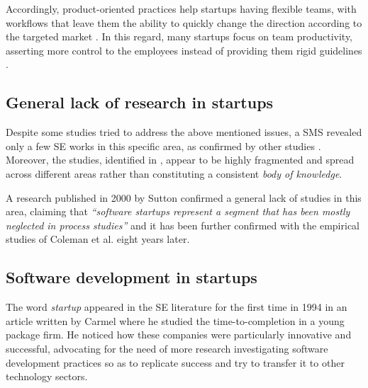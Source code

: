 \documentclass[10pt,journal,letterpaper,compsoc]{IEEEtran}
\begin{document}
Accordingly, product-oriented practices help startups having flexible teams,
with workflows that leave them the ability to quickly change the direction
according to the targeted market  \cite{Heitlager2007,Sutton2000}. In this
regard, many startups focus on team productivity, asserting more control to the
employees instead of providing them rigid guidelines \cite{Tanabian2005,
Chorev2006, Kakati2003}.

\subsection{General lack of research in startups} Despite some studies tried to
address the above mentioned issues, a SMS  \cite{SMS} revealed only a few SE
works in this specific area, as confirmed by  other studies \cite{Coleman2008,
Coleman2008a, Coleman2007, Sutton2000}.  Moreover, the studies, identified in
\cite{SMS}, appear to be highly fragmented  and spread across different areas
rather than constituting a consistent  \textit{body of knowledge}.

A research published in 2000 by Sutton \cite{Sutton2000} confirmed a general
lack of  studies in this area, claiming that \textit{``software startups
represent a segment that has been mostly neglected in process studies''} and it
has been further confirmed with the empirical studies of Coleman et al.
\cite{Coleman2008,Coleman2008a,Coleman2007} eight years later.

\subsection{Software development in startups}

The word \textit{startup} appeared in the SE literature for the first time in
1994 in an article written by Carmel \cite{Camel1994a} where he studied the
time-to-completion in a young package firm. %
He noticed how these companies were particularly innovative and successful,  
advocating for the need of more research investigating software development  
practices so as to replicate success and try to transfer it to other 
technology sectors.
\end{document}
